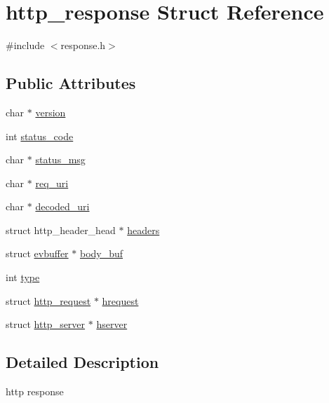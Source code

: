 \hypertarget{structhttp__response}{
\section{http\_\-response Struct Reference}
\label{structhttp__response}
}


{\ttfamily \#include $<$response.h$>$}

\subsection*{Public Attributes}
\begin{DoxyCompactItemize}
\item 
char $\ast$ \hyperlink{structhttp__response_a598a52db98b15ced51745423dca1a61a}{version}
\item 
int \hyperlink{structhttp__response_a2832d0ec07aa88fbf6e4136014bae003}{status\_\-code}
\item 
char $\ast$ \hyperlink{structhttp__response_a7ba51c31f4fa16f868bbfb2448d1b061}{status\_\-msg}
\item 
char $\ast$ \hyperlink{structhttp__response_a6eda538dab467a94b48813a6ea424e62}{req\_\-uri}
\item 
char $\ast$ \hyperlink{structhttp__response_aa39db72fcbd5259b1a8de73b7ce46b47}{decoded\_\-uri}
\item 
struct http\_\-header\_\-head $\ast$ \hyperlink{structhttp__response_a5f7a1145407d477dd6e1f7a65a3dc60f}{headers}
\item 
struct \hyperlink{structevbuffer}{evbuffer} $\ast$ \hyperlink{structhttp__response_ae6bece88a820ee5637ccd2fa7d4b76d4}{body\_\-buf}
\item 
int \hyperlink{structhttp__response_abab20709a27b924ae24eb6e6b03561cc}{type}
\item 
struct \hyperlink{structhttp__request}{http\_\-request} $\ast$ \hyperlink{structhttp__response_af09ef4d96665428d0499b1c4679f5f9a}{hrequest}
\item 
struct \hyperlink{structhttp__server}{http\_\-server} $\ast$ \hyperlink{structhttp__response_a762a56e397857a5f649ad151474daad5}{hserver}
\end{DoxyCompactItemize}


\subsection{Detailed Description}
http response 

